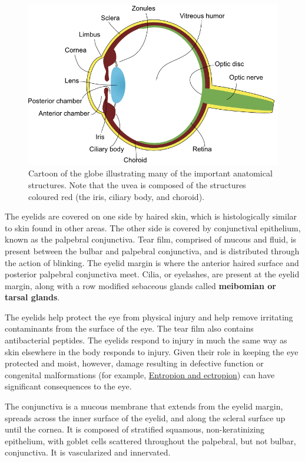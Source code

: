 \documentclass[openany]{book}
\begin{document}
\begin{figure}

{\centering \includegraphics[width=0.6\linewidth]{images/globe-labeled} 

}

\caption{Cartoon of the globe illustrating many of the important anatomical structures. Note that the uvea is composed of the structures coloured red (the iris, ciliary body, and choroid).}\label{fig:globe}
\end{figure}

The eyelids are covered on one side by haired skin, which is
histologically similar to skin found in other areas. The other side is
covered by conjunctival epithelium, known as the palpebral conjunctiva.
Tear film, comprised of mucous and fluid, is present between the bulbar
and palpebral conjunctiva, and is distributed through the action of
blinking. The eyelid margin is where the anterior haired surface and
posterior palpebral conjunctiva meet. Cilia, or eyelashes, are present
at the eyelid margin, along with a row modified sebaceous glands called
\textbf{meibomian or tarsal glands}.

The eyelids help protect the eye from physical injury and help remove
irritating contaminants from the surface of the eye. The tear film also
contains antibacterial peptides. The eyelids respond to injury in much
the same way as skin elsewhere in the body responds to injury. Given
their role in keeping the eye protected and moist, however, damage
resulting in defective function or congenital malformations (for
example, \protect\hyperlink{entropion-and-ectropion}{Entropion and
ectropion}) can have significant consequences to the eye.

The conjunctiva is a mucous membrane that extends from the eyelid
margin, spreads across the inner surface of the eyelid, and along the
scleral surface up until the cornea. It is composed of stratified
squamous, non-keratinizing epithelium, with goblet cells scattered
throughout the palpebral, but not bulbar, conjunctiva. It is
vascularized and innervated.
\end{document}
